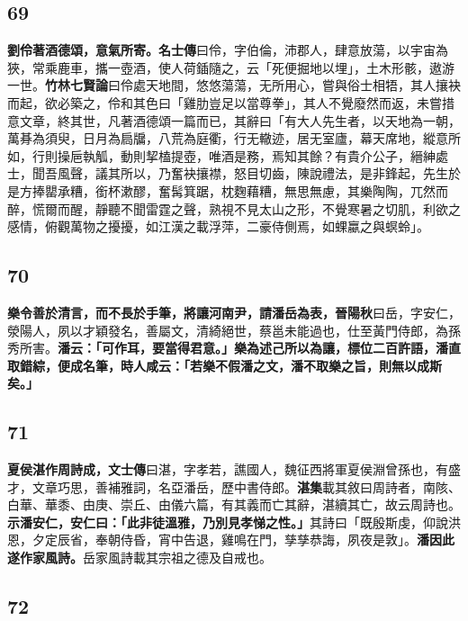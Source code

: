 \subsection*{69}

\textbf{劉伶著酒德頌，意氣所寄。}{\footnotesize \textbf{名士傳}曰伶，字伯倫，沛郡人，肆意放蕩，以宇宙為狹，常乘鹿車，攜一壺酒，使人荷鍤隨之，云「死便掘地以埋」，土木形骸，遨游一世。\textbf{竹林七賢論}曰伶處天地間，悠悠蕩蕩，无所用心，嘗與俗士相牾，其人攘袂而起，欲必築之，伶和其色曰「雞肋豈足以當尊拳」，其人不覺廢然而返，未嘗措意文章，終其世，凡著酒德頌一篇而已，其辭曰「有大人先生者，以天地為一朝，萬朞為須臾，日月為扃牖，八荒為庭衢，行无轍迹，居无室廬，幕天席地，縱意所如，行則操巵執觚，動則挈榼提壺，唯酒是務，焉知其餘？有貴介公子，縉紳處士，聞吾風聲，議其所以，乃奮袂攘襟，怒目切齒，陳說禮法，是非鋒起，先生於是方捧罌承糟，銜杯漱醪，奮髯箕踞，枕麴藉糟，無思無慮，其樂陶陶，兀然而醉，慌爾而醒，靜聽不聞雷霆之聲，熟視不見太山之形，不覺寒暑之切肌，利欲之感情，俯觀萬物之擾擾，如江漢之載浮萍，二豪侍側焉，如蜾蠃之與螟蛉」。}

\subsection*{70}

\textbf{樂令善於清言，而不長於手筆，將讓河南尹，請潘岳為表，}{\footnotesize \textbf{晉陽秋}曰岳，字安仁，滎陽人，夙以才穎發名，善屬文，清綺絕世，蔡邕未能過也，仕至黃門侍郎，為孫秀所害。}\textbf{潘云：「可作耳，要當得君意。」樂為述己所以為讓，標位二百許語，潘直取錯綜，便成名筆，時人咸云：「若樂不假潘之文，潘不取樂之旨，則無以成斯矣。」}

\subsection*{71}

\textbf{夏侯湛作周詩成，}{\footnotesize \textbf{文士傳}曰湛，字孝若，譙國人，魏征西將軍夏侯淵曾孫也，有盛才，文章巧思，善補雅詞，名亞潘岳，歷中書侍郎。\textbf{湛集}載其敘曰周詩者，南陔、白華、華黍、由庚、崇丘、由儀六篇，有其義而亡其辭，湛續其亡，故云周詩也。}\textbf{示潘安仁，安仁曰：「此非徒溫雅，乃別見孝悌之性。」}{\footnotesize 其詩曰「既殷斯虔，仰說洪恩，夕定辰省，奉朝侍昏，宵中告退，雞鳴在門，孳孳恭誨，夙夜是敦」。}\textbf{潘因此遂作家風詩。}{\footnotesize 岳家風詩載其宗祖之德及自戒也。}

\subsection*{72}

